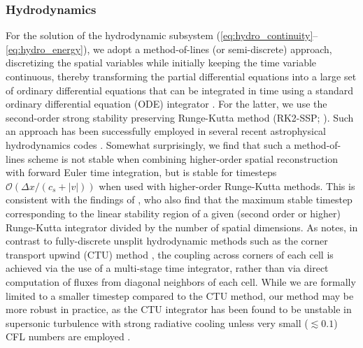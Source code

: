 \documentclass[fleqn,usenatbib]{mnras}
\begin{document}
\subsubsection{Hydrodynamics}
\label{sssec:hydro}
For the solution of the hydrodynamic subsystem (\autoref{eq:hydro_continuity}--\autoref{eq:hydro_energy}), we adopt a method-of-lines (or semi-discrete) approach, discretizing the spatial variables while initially keeping the time variable continuous, thereby transforming the partial differential equations into a large set of ordinary differential equations that can be integrated in time using a standard ordinary differential equation (ODE) integrator \citep{Jameson_1981}. For the latter, we use the second-order strong stability preserving Runge-Kutta method (RK2-SSP; \citealt{Shu_1988}). Such an approach has been successfully employed in several recent astrophysical hydrodynamics codes \citep{Skinner_2019,Stone_2020}. Somewhat surprisingly, we find that such a method-of-lines scheme is not stable when combining higher-order spatial reconstruction with forward Euler time integration, but is stable for timesteps $\mathcal{O}(\Delta x / (c_s + |v|))$ when used with higher-order Runge-Kutta methods. This is consistent with the findings of \cite{Stone_2020}, who also find that the maximum stable timestep corresponding to the linear stability region of a given (second order or higher) Runge-Kutta integrator divided by the number of spatial dimensions. As \cite{Skinner_2019} notes, in contrast to fully-discrete unsplit hydrodynamic methods such as the corner transport upwind (CTU) method \citep{Colella_1990}, the coupling across corners of each cell is achieved via the use of a multi-stage time integrator, rather than via direct computation of fluxes from diagonal neighbors of each cell. While we are formally limited to a smaller timestep compared to the CTU method, our method may be more robust in practice, as the CTU integrator has been found to be unstable in supersonic turbulence with strong radiative cooling unless very small ($\lesssim 0.1$) CFL numbers are employed \citep{Schneider_2017}.
\end{document}
